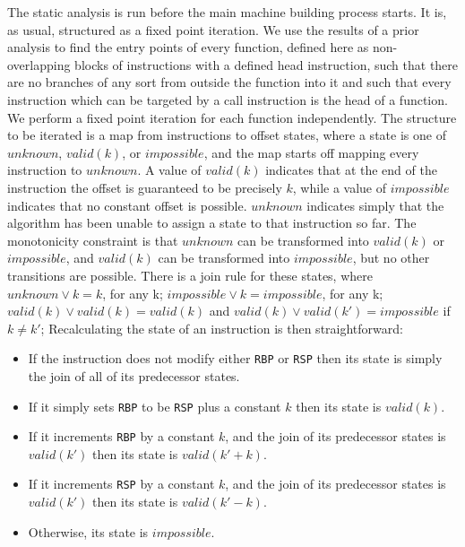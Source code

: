 \documentclass[12pt,a4paper]{book}
\begin{document}
The static analysis is run before the main machine building process starts.
It is, as usual, structured as a fixed point iteration.
We use the results of a prior analysis to find the entry points of every function, defined here as non-overlapping blocks of instructions with a defined head instruction, such that there are no branches of any sort from outside the function into it and such that every instruction which can be targeted by a call instruction is the head of a function.
We perform a fixed point iteration for each function independently.
The structure to be iterated is a map from instructions to offset states, where a state is one of $unknown$, $valid(k)$, or $impossible$, and the map starts off mapping every instruction to $unknown$.
A value of $valid(k)$ indicates that at the end of the instruction the offset is guaranteed to be precisely $k$, while a value of $impossible$ indicates that no constant offset is possible.
$unknown$ indicates simply that the algorithm has been unable to assign a state to that instruction so far.
The monotonicity constraint is that $unknown$ can be transformed into $valid(k)$ or $impossible$, and $valid(k)$ can be transformed into $impossible$, but no other transitions are possible.
There is a join rule for these states, where $unknown \vee k = k$, for any k; $impossible \vee k = impossible$, for any k; $valid(k) \vee valid(k) = valid(k)$ and $valid(k) \vee valid(k') = impossible$ if $k \neq k'$;
Recalculating the state of an instruction is then straightforward:

\begin{itemize}
\item
  If the instruction does not modify either \verb|RBP| or \verb|RSP| then its state is simply the join of all of its predecessor states.
\item
  If it simply sets \verb|RBP| to be \verb|RSP| plus a constant $k$ then its state is $valid(k)$.
\item
  If it increments \verb|RBP| by a constant $k$, and the join of its predecessor states is $valid(k')$ then its state is $valid(k'+k)$.
\item
  If it increments \verb|RSP| by a constant $k$, and the join of its predecessor states is $valid(k')$ then its state is $valid(k'-k)$.
\item
  Otherwise, its state is $impossible$.
\end{itemize}
\end{document}
